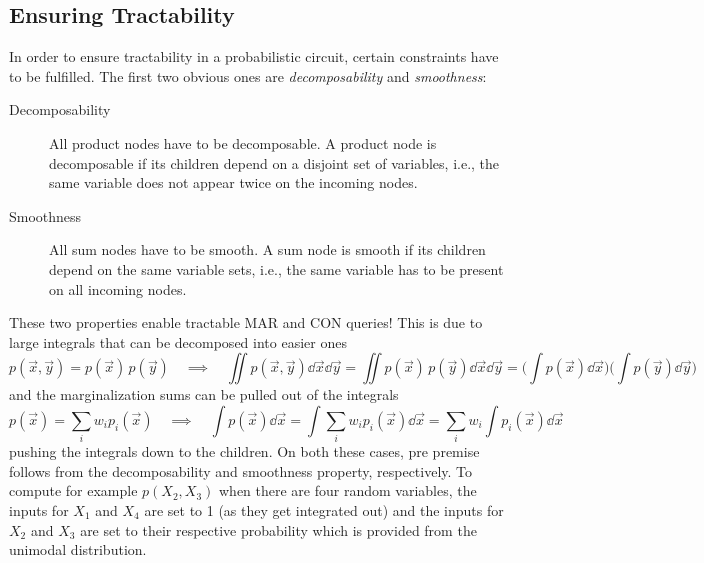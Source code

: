 		\subsection{Ensuring Tractability}
			\label{subsec:probCircTractability}

			In order to ensure tractability in a probabilistic circuit, certain constraints have to be fulfilled. The first two obvious ones are \emph{decomposability} and \emph{smoothness}:
			\begin{description}
				\item[Decomposability] All product nodes have to be decomposable. A product node is decomposable if its children depend on a disjoint set of variables, i.e., the same variable does not appear twice on the incoming nodes.
				\item[Smoothness] All sum nodes have to be smooth. A sum node is smooth if its children depend on the same variable sets, i.e., the same variable has to be present on all incoming nodes.
			\end{description}
			These two properties enable tractable MAR and CON queries! This is due to large integrals that can be decomposed into easier ones
			\begin{equation}
				p(\vec{x}, \vec{y}) = p(\vec{x}) \, p(\vec{y})
				\quad\implies\quad
				\iint\! p(\vec{x}, \vec{y}) \dd{\vec{x}} \dd{\vec{y}}
				= \iint\! p(\vec{x}) \, p(\vec{y}) \dd{\vec{x}} \dd{\vec{y}}
				= \bigg(\! \int\! p(\vec{x}) \dd{\vec{x}} \!\!\bigg) \bigg(\! \int\! p(\vec{y}) \dd{\vec{y}} \!\!\bigg)
			\end{equation}
			and the marginalization sums can be pulled out of the integrals
			\begin{equation}
				p(\vec{x}) = \sum_i w_i p_i(\vec{x})
				\quad\implies\quad
				\int\! p(\vec{x}) \dd{\vec{x}}
				= \int \sum_i w_i p_i(\vec{x}) \dd{\vec{x}}
				= \sum_i w_i \int\! p_i(\vec{x}) \dd{\vec{x}}
			\end{equation}
			pushing the integrals down to the children. On both these cases, pre premise follows from the decomposability and smoothness property, respectively. To compute for example \( p(X_2, X_3) \) when there are four random variables, the inputs for \( X_1 \) and \( X_4 \) are set to \num{1} (as they get integrated out) and the inputs for \( X_2 \) and \( X_3 \) are set to their respective probability which is provided from the unimodal distribution.

